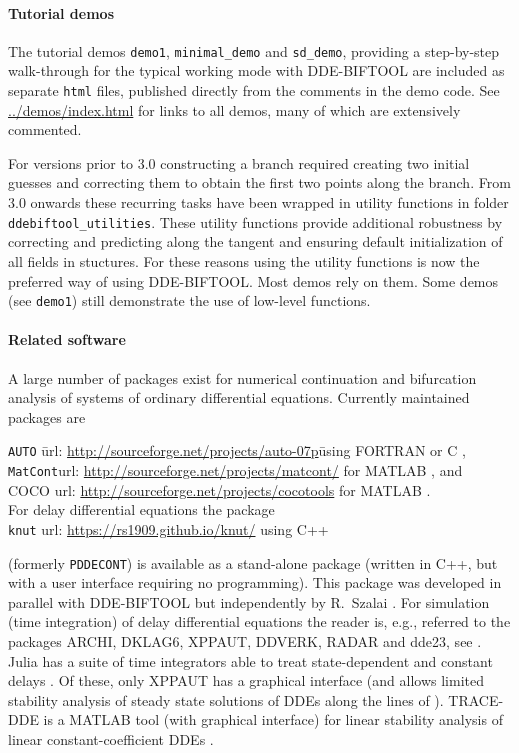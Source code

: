 \documentclass[10pt]{scrartcl}
\newcommand{\DDEBIFCODE}{\textsc{DDE-BIFTOOL}}
\newcommand{\ddebifweb}{\url{https://sourceforge.net/projects/ddebiftool}}
\newcommand{\demobase}{\url{../demos/index.html}}
\begin{document}
\paragraph{Tutorial demos}
The tutorial demos \texttt{demo1}, \texttt{minimal\_demo} and
\texttt{sd\_demo}, providing a step-by-step walk-through for the
typical working mode with \DDEBIFCODE{} are included as separate
\texttt{html} files, published directly from the comments in the demo
code. See \demobase{} for links to all demos, many of which are
extensively commented.

For versions prior to 3.0 constructing a branch required creating two
initial guesses and correcting them to obtain the first two points
along the branch. From 3.0 onwards these recurring tasks have been
wrapped in utility functions in folder
\texttt{ddebiftool\_utilities}. These utility functions provide
additional robustness by correcting and predicting along the tangent
and ensuring default initialization of all fields in stuctures. For
these reasons using the utility functions is now the preferred way of
using \DDEBIFCODE{}. Most demos rely on them. Some demos (see
\texttt{demo1}) still demonstrate the use of low-level functions.


\paragraph{Related software}
A large number of packages exist for numerical continuation and
bifurcation analysis of systems of ordinary differential
equations. Currently maintained packages are
\begin{tabbing}
  \texttt{AUTO}\qquad
  \= url: \url{http://sourceforge.net/projects/auto-07p}\qquad\=
  using FORTRAN or C \cite{Doed99,Doed07},\\
  \texttt{MatCont}\>url: \url{http://sourceforge.net/projects/matcont/}\>
  for MATLAB \cite{DGK03,G00}, and\\
  \textsc{COCO}\> url: \url{http://sourceforge.net/projects/cocotools}\> for
  MATLAB \cite{DS13}.\\[1ex]
  For delay differential equations the package\\[0.5ex]
  \texttt{knut}\> url: \url{https://rs1909.github.io/knut/}\> using C++
\end{tabbing}
(formerly \texttt{PDDECONT}) is available as a stand-alone package
(written in C++, but with a user interface requiring no
programming). This package was developed in parallel with
\DDEBIFCODE{} but independently by R.~Szalai \cite{SSH06,RS07}.  For
simulation (time integration) of delay differential equations the
reader is, e.g., referred to the packages ARCHI, DKLAG6, XPPAUT,
DDVERK, RADAR and dde23, see
\cite{Paul95,Thom97,Erme98,Enri97,Sham00,Gugl07}. Julia has a suite of
time integrators able to treat state-dependent and constant delays
\cite{RN17Julia}. Of these, only XPPAUT has a graphical interface (and
allows limited stability analysis of steady state solutions of DDEs
along the lines of \cite{Luzy96}). TRACE-DDE is a MATLAB tool (with
graphical interface) for linear stability analysis of linear
constant-coefficient DDEs
\cite{breda09}.%
\end{document}
